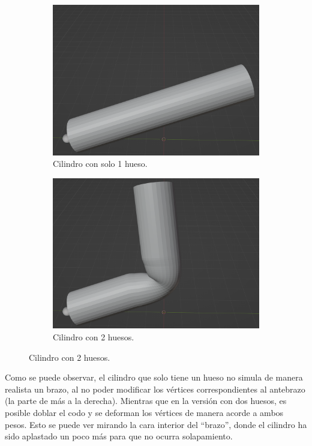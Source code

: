 \documentclass[]{article}
\begin{document}
\begin{figure}[H]
\begin{subfigure}{0.48\textwidth}
   \centering
   \includegraphics[width=\textwidth]{imagenes/brazo1.png}
   \caption{Cilindro con solo 1 hueso.}
\end{subfigure}
\hfill
\begin{subfigure}{0.48\textwidth}
   \centering
   \includegraphics[width=\textwidth]{imagenes/brazo2.png}
   \caption{Cilindro con 2 huesos.}
\end{subfigure}
\end{figure}

Como se puede observar, el cilindro que solo tiene un hueso no simula de manera realista un brazo, al no poder modificar los vértices correspondientes al antebrazo (la parte de más a la derecha). Mientras que en la versión con dos huesos, es posible doblar el codo y se deforman los vértices de manera acorde a ambos pesos. Esto se puede ver mirando la cara interior del ``brazo'', donde el cilindro ha sido aplastado un poco más para que no ocurra solapamiento.

\newpage



\end{document}
